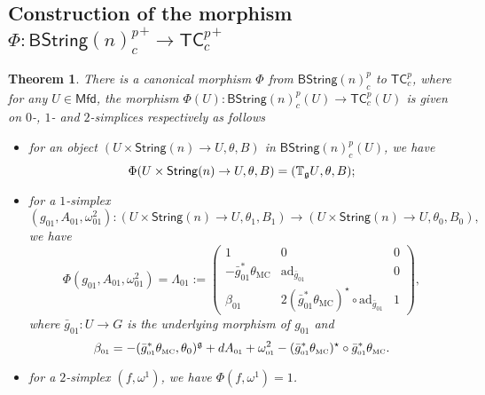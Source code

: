 \documentclass[letterpaper,10pt, oneside]{article} %
\newtheorem{thm}{Theorem}[section]
\newcommand{\Mfd}{\mathsf{Mfd}}%
\newcommand{\tcalgdp}{{\mathsf{TC}^{p}_{c}}} %
\newcommand{\tcalgdpp}{{\mathsf{TC}^{p}_{c}}^+} %
\newcommand{\bstringnp}{\mathsf{BString}(n)^p_{c}} %
\newcommand{\bstringnpp}{{\mathsf{BString}(n)^p_{c}}^+} %
\newcommand{\String}{\mathsf{String}}%
\newcommand{\Spin}{\mathsf{Spin}}%
\newcommand{\tagu}{{\mathbb{T}_\g U}}
\newcommand{\TM}{\theta_{\scriptscriptstyle \mathrm{MC}}}
\newcommand{\Ad}{\mathrm{Ad}}
\newcommand{\ad}{\mathrm{ad}}
\begin{document}
\subsection{Construction of the morphism $\Phi: \bstringnpp \to \tcalgdpp$}



\begin{thm}\label{Naturaltransformation}
There is a canonical morphism $\Phi$ from $\bstringnp$ to $\tcalgdp$, where
for any $U\in\Mfd$, the morphism $\Phi(U):\bstringnp(U)\rightarrow\tcalgdp(U)$ is given on $0$-, $1$- and $2$-simplices respectively as follows
\begin{itemize}
\item for an object $(U\times \String(n)\to U, \theta, B)$ in $\bstringnp(U)$, we have
$$\Phi(U\times \String(n)\to U, \theta, B)=(\tagu,
   \theta, B);$$

\item for a $1$-simplex $(g_{\scriptscriptstyle 01}, A_{\scriptscriptstyle 01}, \omega^2_{\scriptscriptstyle 01}): (U\times \String(n)\to U, \theta_1, B_1) \rightarrow (U\times \String(n)\to U, \theta_0, B_0),$ we have
$$\Phi(g_{\scriptscriptstyle 01}, A_{\scriptscriptstyle 01}, \omega^2_{\scriptscriptstyle 01})=\Lambda_{\scriptscriptstyle 01} := \left(\begin{array}{ccc}
1&0&0\\
-\bar{g}_{\scriptscriptstyle 01}^*\TM&\ad_{\bar{g}_{\scriptscriptstyle 01}}&0\\
\beta_{\scriptscriptstyle 01}&2(\bar{g}_{\scriptscriptstyle 01}^*{\TM})^\star\circ\ad_{\bar{g}_{\scriptscriptstyle 01}}&1
\end{array}\right),$$
where   $\bar{g}_{\scriptscriptstyle 01}:U\rightarrow G$ is the underlying morphism of $g_{\scriptscriptstyle 01}$ and $$\beta_{\scriptscriptstyle 01}=-(\bar{g}_{\scriptscriptstyle 01}^*\TM,\theta_0)^\g+dA_{\scriptscriptstyle 01}+\omega^2_{\scriptscriptstyle 01}-(\bar{g}_{\scriptscriptstyle 01}^*\TM)^\star \circ \bar{g}_{\scriptscriptstyle 01}^*\TM.$$

\item for a $2$-simplex $(f, \omega^1)$, we have $\Phi(f,\omega^1)=1$.

\end{itemize}
\end{thm}
\end{document}
